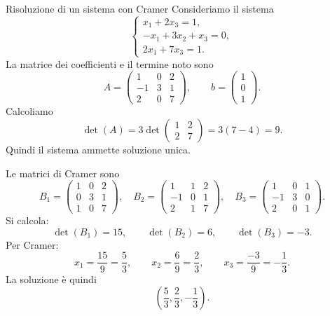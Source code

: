 \documentclass[a4paper]{article}
\begin{document}
\begin{snippetexample}{Risoluzione di un sistema con Cramer}
    Consideriamo il sistema
    \[
        \begin{cases}
            x_1+2x_3=1,\\
            -x_1+3x_2+x_3=0,\\
            2x_1+7x_3=1.
        \end{cases}
    \]
    La matrice dei coefficienti e il termine noto sono
    \[
        A=
        \begin{pmatrix}
            1 & 0 & 2\\
            -1 & 3 & 1\\
            2 & 0 & 7
        \end{pmatrix},
        \qquad
        b=
        \begin{pmatrix}
            1\\
            0\\
            1
        \end{pmatrix}.
    \]
    Calcoliamo
    \[
        \det(A)
        =
        3\det
        \begin{pmatrix}
            1 & 2\\
            2 & 7
        \end{pmatrix}
        =
        3(7-4)
        =
        9.
    \]
    Quindi il sistema ammette soluzione unica.

    Le matrici di Cramer sono
    \[
        B_1=
        \begin{pmatrix}
            1 & 0 & 2\\
            0 & 3 & 1\\
            1 & 0 & 7
        \end{pmatrix},
        \quad
        B_2=
        \begin{pmatrix}
            1 & 1 & 2\\
            -1 & 0 & 1\\
            2 & 1 & 7
        \end{pmatrix},
        \quad
        B_3=
        \begin{pmatrix}
            1 & 0 & 1\\
            -1 & 3 & 0\\
            2 & 0 & 1
        \end{pmatrix}.
    \]
    Si calcola:
    \[
        \det(B_1)=15,
        \qquad
        \det(B_2)=6,
        \qquad
        \det(B_3)=-3.
    \]
    Per Cramer:
    \[
        x_1=\frac{15}{9}=\frac{5}{3},
        \qquad
        x_2=\frac{6}{9}=\frac{2}{3},
        \qquad
        x_3=\frac{-3}{9}=-\frac{1}{3}.
    \]
    La soluzione è quindi
    \[
        \left(\frac{5}{3},\frac{2}{3},-\frac{1}{3}\right).
    \]
\end{snippetexample}
\end{document}
